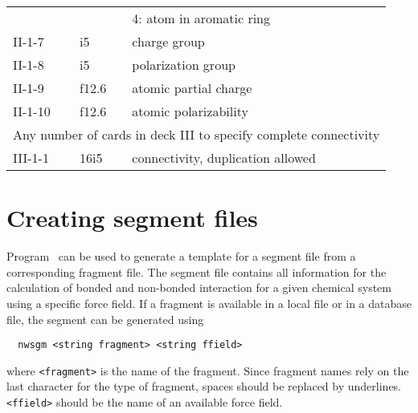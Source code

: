 \begin{center}
\begin{tabular}{lll}
        &        & 4: atom in aromatic ring\\
II-1-7  & i5     & charge group\\
II-1-8  & i5     & polarization group\\
II-1-9  & f12.6  & atomic partial charge\\
II-1-10 & f12.6  & atomic polarizability\\
\hline
\multicolumn{3}{l}{Any number of cards in deck III to specify complete 
connectivity} \\
\hline
III-1-1  & 16i5   & connectivity, duplication allowed\\ 
\hline\hline
\end{tabular}
\end{center}

\section{Creating segment files}
\label{sec:nwanwsgm}
Program \nwsgm\ can be used to generate a template for a segment file 
from a corresponding fragment file. The segment file contains all
information for the calculation of bonded and non-bonded interaction
for a given chemical system using a specific force field. If a
fragment is available in a local file or in a database file, the
segment can be generated using
\begin{verbatim}
  nwsgm <string fragment> <string ffield>
\end{verbatim}
where \verb+<fragment>+ is the name of the fragment. Since fragment
names rely on the last character for the type of fragment, spaces
should be replaced by underlines. \verb+<ffield>+ should be the
name of an available force field.

